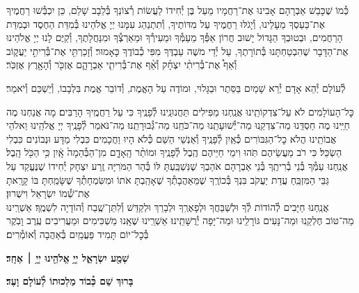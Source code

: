 \documentclass[twoside, openany, parskip=half, 11pt]{book}
\begin{document}
כְּ֯מוֹ שֶׁכָּבַשׁ אַבְרָהָם אָבִינוּ אֶת־רַחֲמָיו מֵעַל בֶּן יְ֯חִידוֹ לַעֲשׂוֹת רְ֯צוֹנְךָ בְּ֯לֵבָב שָׁלֵם, כֵּן יִכְבְּ֯שׁוּ רַחֲמֶיךָ אֶת־כַּעַסְךָ מֵעָלֵינוּ, וְ֯יָגֹלּוּ רַחֲמֶיךָ עַל מִדּוֹתֶיךָ, וְ֯תִתְנַהֵג עִמָּנוּ יְיָ אֱלֹהֵינוּ בְּ֯מִדַּת הַחֶסֶד וּבְמִדַּת הָרַחֲמִים, וּבְטוּבְךָ הַגָּדוֹל יָשׁוּב חֲרוֹן אַפְּ֯ךָ מֵעַמְּ֯ךָ וּמֵעִירְ֯ךָ וּמֵאַרְצְ֯ךָ וּמִנַּחֲלָתֶךָ, וְ֯קַיֶּם לָנוּ יְיָ אֱלֹהֵינוּ אֶת־הַדָּבָר שֶׁהִבְטַחְתָּנוּ בְּ֯תוֹרָתֶךָ, עַל יְ֯דֵי משֶׁה עַבְדֶּךָ מִפִּי כְ֯בוֹדֶךָ כָּאָמוּר׃ וְ֯זָכַרְתִּ֖י אֶת־בְּ֯רִיתִ֣י יַעֲק֑וֹב וְ֯אַף֩ אֶת־בְּ֯רִיתִ֨י יִצְחָ֜ק וְ֯אַ֨ף אֶת־בְּ֯רִיתִ֧י אַבְרָהָ֛ם אֶזְכֹּ֖ר וְ֯הָאָ֥רֶץ אֶזְכֹּֽר׃

\begin{small}
לְ֯עוֹלָם יְ֯הֵא אָדָם יְ֯רֵא שָׁמַיִם בַּסֵּתֶר וּבַגָּלוּי, וּמוֹדֶה עַל הָאֱמֶת, וְ֯דוֹבֵר אֱמֶת בִּלְבָבוֹ, וְ֯יַשְׁכֵּם וְ֯יֹאמַר׃
\end{small}
כׇּל־הָעוֹלָמִים לֹא עַל־צִדְקוֹתֵֽינוּ אֲנַֽחְנוּ מַפִּילִים תַּחֲנוּנֵֽינוּ לְ֯פָנֶֽיךָ כִּי עַל רַחֲמֶֽיךָ הָרַבִּים׃ מָה אֲנַחְנוּ מֶה חַיֵּֽינוּ מֶה חַסְדֵּֽנוּ מַה־צִּדְקֵֽנוּ מַה־יְּ֯שׁוּעָתֵֽנוּ מַה־כֹּחֵֽנוּ מַה־גְּ֯בוּרָתֵֽנוּ׃ מַה־נֹּאמַר לְ֯פָנֶֽיךָ יְיָ אֱלֹהֵֽינוּ וֵאלֹהֵי אֲבוֹתֵֽינוּ הֲלֹא כׇל־הַגִּבּוֹרִים כְּ֯אַֽיִן לְ֯פָנֶֽיךָ וְ֯אַנְשֵׁי הַשֵּׁם כְּ֯לֹא הָיוּ וַחֲכָמִים כִּבְלִי מַדָּע וּנְבוֹנִים כִּבְלִי הַשְׂכֵּל׃ כִּי רֹב מַעֲשֵׂיהֶם תֹּֽהוּ וִימֵי חַיֵּיהֶם הֶֽבֶל לְ֯פָנֶֽיךָ וּמוֹתַ֨ר הָֽאָדָ֤ם מִן־הַבְּ֯הֵמָה֙ אָֽ֔יִן כִּ֥י הַכֹּ֖ל הָֽבֶל׃ \\
אֲנַֽחְנוּ עַמְּ֯ךָ בְּ֯נֵי בְ֯רִיתֶֽךָ בְּ֯נֵי אַבְרָהָם אֹהַבְךָ שֶׁנִּשְׁבַּֽעְתָּ לּוֹ בְּ֯הַר הַמֹּרִיָּה זֶֽרַע יִצְחָק יְ֯חִידוֹ שֶׁנֶּעֱקַד עַל גַּבֵּי הַמִּזְבֵּֽחַ עֲדַת יַעֲקֹב בִּנְךָ בְּ֯כוֹרֶֽךָ שֶׁמֵּאַהֲבָתְ֯ךָ שֶׁאָהַֽבְתָּ אֹתוֹ וּמִשִּׂמְחָתְ֯ךָ שֶׁשָּׂמַֽחְתָּ בּוֹ קָרָֽאתָ אֶת־שְׁ֯מוֹ יִשְׂרָאֵל וִישֻׁרוּן׃ \\
אֲנַֽחְנוּ חַיָּבִים לְ֯הוֹדוֹת לְ֯ךָ וּלְשַׁבֵּחֲךָ וּלְפָאֶרְֽךָ וּלְבָרֵךְ וּלְקַדֵּשׁ וְ֯לִתֵּן־שֶֽׁבַח וְ֯הוֹדָיָה לִשְׁמֶֽךָ׃ אַשְׁרֵֽינוּ מַה־טּוֹב חֶלְקֵֽנוּ וּמַה־נָּעִים גּוֹרָלֵֽינוּ וּמַה־יָּפָה יְ֯רֻשָּׁתֵֽינוּ׃ אַשְׁרֵֽינוּ שֶׁאָֽנוּ מַשְׁכִּימִים וּמַעֲרִיבִים עֶֽרֶב וָבֹֽקֶר בְּ֯כׇל־יוֹם תָּמִיד פַּעֲמַֽיִם בְּ֯אַהֲבָה וְ֯אוֹמְ֯רִים׃

\begin{Large}
\textbf{שְׁמַ֖ע יִשְׂרָאֵ֑ל יְיָ֥ אֱלֹהֵ֖ינוּ יְיָ֥ ׀ אֶחָֽד׃}
\end{Large}

\textbf{%
בָּרוּךְ שֵׁם כְּ֯בוֹד מַלְכוּתוֹ לְ֯עוֹלָם וָעֶד׃
}
\end{document}

